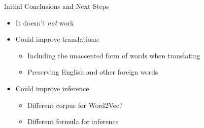 \documentclass{beamer}
\begin{document}
\begin{frame}{Initial Conclusions and Next Steps}
\begin{itemize}
\item It doesn't \emph{not} work
\item Could improve translations:
\begin{itemize}
\item Including the unaccented form of words when translating
\item Preserving English and other foreign words
\end{itemize}
\item Could improve inference
\begin{itemize}
\item Different corpus for Word2Vec?
\item Different formula for inference
\end{itemize}
\end{itemize}
\end{frame}
\end{document}
